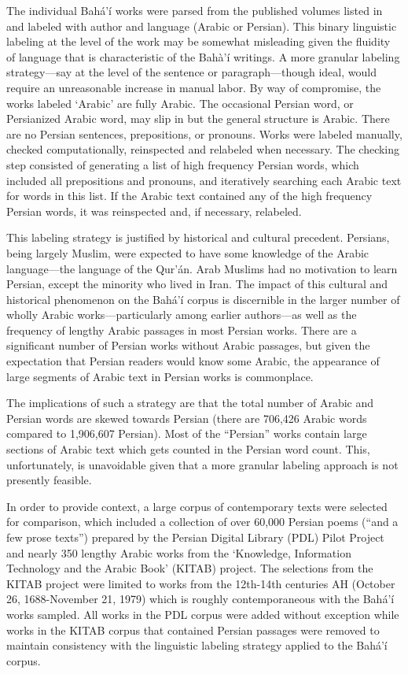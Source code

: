 \documentclass[12pt, oneside]{report}
\begin{document}
\par
The individual Bah\'{a}'\'{i} works were parsed from the published volumes listed in  and labeled with author and language (Arabic or Persian).
This binary linguistic labeling at the level of the work may be somewhat misleading given the fluidity of language that is characteristic of the Bah\`{a}'\'{i} writings.
A more granular labeling strategy---say at the level of the sentence or paragraph---though ideal, would require an unreasonable increase in manual labor.
By way of compromise, the works labeled `Arabic' are fully Arabic.
The occasional Persian word, or Persianized Arabic word, may slip in but the general structure is Arabic.
There are no Persian sentences, prepositions, or pronouns.
Works were labeled manually, checked computationally, reinspected and relabeled when necessary.
The checking step consisted of generating a list of high frequency Persian words, which included all prepositions and pronouns, and iteratively searching each Arabic text for words in this list.
If the Arabic text contained any of the high frequency Persian words, it was reinspected and, if necessary, relabeled.
\par
This labeling strategy is justified by historical and cultural precedent.
Persians, being largely Muslim, were expected to have some knowledge of the Arabic language---the language of the Qur'\'{a}n.
Arab Muslims had no motivation to learn Persian, except the minority who lived in Iran.
The impact of this cultural and historical phenomenon on the Bah\'{a}'\'{i} corpus is discernible in the larger number of wholly Arabic works---particularly among earlier authors---as well as the frequency of lengthy Arabic passages in most Persian works.
There are a significant number of Persian works without Arabic passages, but given the expectation that Persian readers would know some Arabic, the appearance of large segments of Arabic text in Persian works is commonplace.
\par
The implications of such a strategy are that the total number of Arabic and Persian words are skewed towards Persian (there are 706,426 Arabic words compared to 1,906,607 Persian).
Most of the ``Persian'' works contain large sections of Arabic text which gets counted in the Persian word count.
This, unfortunately, is unavoidable given that a more granular labeling approach is not presently feasible.
\par
In order to provide context, a large corpus of contemporary texts were selected for comparison, which included a collection of over 60,000 Persian poems (``and a few prose texts'') prepared by the Persian Digital Library (PDL) Pilot Project \cite{noauthor_persian_nodate} and nearly 350 lengthy Arabic works from the `Knowledge, Information Technology and the Arabic Book' (KITAB) \cite{maxim_romanov_openiti:_2019} project.
The selections from the KITAB project were limited to works from the 12th-14th centuries AH (October 26, 1688-November 21, 1979) which is roughly contemporaneous with the Bah\'{a}'\'{i} works sampled.
All works in the PDL corpus were added without exception while works in the KITAB corpus that contained Persian passages were removed to maintain consistency with the linguistic labeling strategy applied to the Bah\'{a}'\'{i} corpus.
\end{document}
